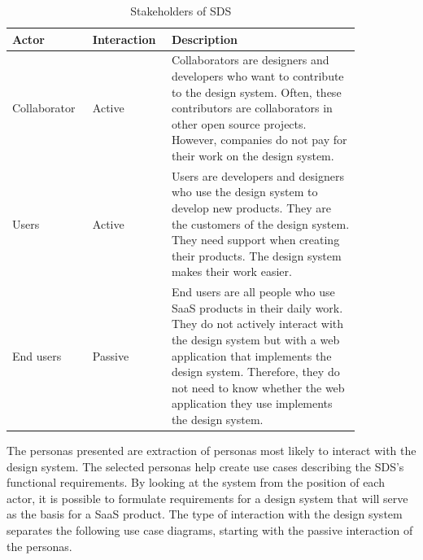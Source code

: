 \begin{table}[!ht]
    \begin{tabular}{|p{0.2\linewidth} | p{0.15\linewidth}| p{0.5\linewidth}|}
    \hline
     \textbf{Actor} &\textbf{Interaction} & \textbf{Description} \\ \hline
     Collaborator & Active & Collaborators are designers and developers who want to contribute to the design system. Often, these contributors are collaborators in other open source projects. However, companies do not pay for their work on the design system.   \\ \hline
     Users & Active & Users are developers and designers who use the design system to develop new products. They are the customers of the design system. They need support when creating their products. The design system makes their work easier.   \\ \hline
     End users & Passive & End users are all people who use \ac{SaaS} products in their daily work. They do not actively interact with the design system but with a web application that implements the design system. Therefore, they do not need to know whether the web application they use implements the design system.  \\ \hline
     
    \end{tabular}
    \caption{\label{tab:stakeholders_sds} Stakeholders of \ac{SDS}}
\end{table}
The personas presented are extraction of personas most likely to interact with the design system. The selected personas help create use cases describing the \ac{SDS}'s functional requirements. By looking at the system from the position of each actor, it is possible to formulate requirements for a design system that will serve as the basis for a \ac{SaaS} product. The type of interaction with the design system separates the following use case diagrams, starting with the passive interaction of the personas. \\

